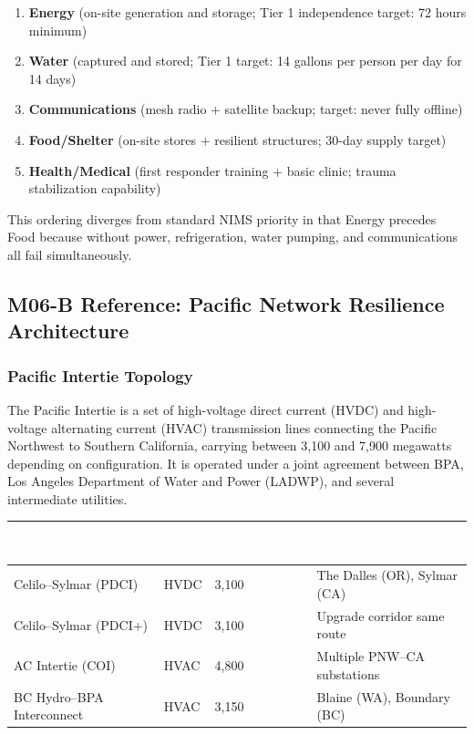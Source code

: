 \documentclass[11pt,letterpaper]{article}
\newcommand{\tableheader}[1]{\textbf{\sffamily\textcolor{white}{#1}}}
\begin{document}
\begin{enumerate}[leftmargin=1.5em]
  \item \textbf{Energy} (on-site generation and storage; Tier 1 independence target: 72 hours minimum)
  \item \textbf{Water} (captured and stored; Tier 1 target: 14 gallons per person per day for 14 days)
  \item \textbf{Communications} (mesh radio + satellite backup; target: never fully offline)
  \item \textbf{Food/Shelter} (on-site stores + resilient structures; 30-day supply target)
  \item \textbf{Health/Medical} (first responder training + basic clinic; trauma stabilization capability)
\end{enumerate}

This ordering diverges from standard NIMS priority in that Energy precedes Food because without power, refrigeration, water pumping, and communications all fail simultaneously.

\subsection{M06-B Reference: Pacific Network Resilience Architecture}

\subsubsection{Pacific Intertie Topology}

The Pacific Intertie is a set of high-voltage direct current (HVDC) and high-voltage alternating current (HVAC) transmission lines connecting the Pacific Northwest to Southern California, carrying between 3,100 and 7,900 megawatts depending on configuration. It is operated under a joint agreement between BPA, Los Angeles Department of Water and Power (LADWP), and several intermediate utilities.

\begin{center}
\begin{tabularx}{\textwidth}{L{3cm}C{2cm}C{2.5cm}X}
\toprule
{}
\tableheader{Line Segment} & \tableheader{Type} & \tableheader{Capacity (MW)} & \tableheader{Key Nodes} \\
\midrule
Celilo--Sylmar (PDCI) & HVDC & 3,100 & The Dalles (OR), Sylmar (CA) \\
Celilo--Sylmar (PDCI+) & HVDC & 3,100 & Upgrade corridor same route \\
AC Intertie (COI) & HVAC & 4,800 & Multiple PNW--CA substations \\
BC Hydro--BPA Interconnect & HVAC & 3,150 & Blaine (WA), Boundary (BC) \\
\bottomrule
\end{tabularx}
\end{center}
\end{document}
